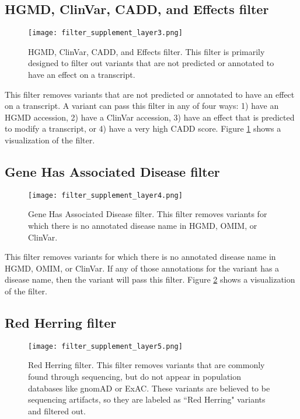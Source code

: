 \documentclass{article}
\begin{document}
\subsection{HGMD, ClinVar, CADD, and Effects filter}

\begin{figure}
\centering
\texttt{[image: filter\_supplement\_layer3.png]}
\caption{HGMD, ClinVar, CADD, and Effects filter.  This filter is primarily designed to filter out variants that are not predicted or annotated to have an effect on a transcript.}
\label{fig:filter3}
\end{figure}

This filter removes variants that are not predicted or annotated to have an effect on a transcript.  A variant can pass this filter in any of four ways: 1) have an HGMD accession, 2) have a ClinVar accession, 3) have an effect that is predicted to modify a transcript, or 4) have a very high CADD score.  Figure \ref{fig:filter3} shows a visualization of the filter.

\subsection{Gene Has Associated Disease filter}

\begin{figure}
\centering
\texttt{[image: filter\_supplement\_layer4.png]}
\caption{Gene Has Associated Disease filter.  This filter removes variants for which there is no annotated disease name in HGMD, OMIM, or ClinVar.}
\label{fig:filter4}
\end{figure}

This filter removes variants for which there is no annotated disease name in HGMD, OMIM, or ClinVar.  If any of those annotations for the variant has a disease name, then the variant will pass this filter.  Figure \ref{fig:filter4} shows a visualization of the filter.

\subsection{Red Herring filter}

\begin{figure}
\centering
\texttt{[image: filter\_supplement\_layer5.png]}
\caption{Red Herring filter.  This filter removes variants that are commonly found through sequencing, but do not appear in population databases like gnomAD or ExAC.  These variants are believed to be sequencing artifacts, so they are labeled as ``Red Herring" variants and filtered out.}
\label{fig:filter5}
\end{figure}
\end{document}
